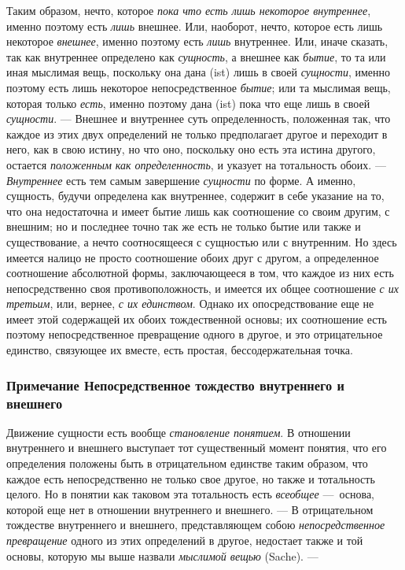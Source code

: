 Таким образом, нечто, которое {\em пока что есть лишь
некоторое внутреннее}, именно поэтому есть {\em лишь}
внешнее. Или, наоборот, нечто, которое есть лишь некоторое
{\em внешнее}, именно поэтому есть
{\em лишь} внутреннее. Или, иначе сказать, так как
внутреннее определено как {\em сущность}, а внешнее как
{\em бытие}, то та или иная мыслимая вещь, поскольку
она дана (ist) лишь в своей {\em сущности}, именно
поэтому есть лишь некоторое непосредственное
{\em бытие}; или та мыслимая вещь, которая только
{\em есть}, именно поэтому дана (ist) пока что еще лишь
в своей {\em сущности}. — Внешнее и внутреннее суть
определенность, положенная так, что каждое из этих двух определений не
только предполагает другое и переходит в него, как в свою истину, но что
оно, поскольку оно есть эта истина другого, остается
{\em положенным как определенность}, и указует на
тотальность обоих. — {\em Внутреннее} есть тем самым
завершение {\em сущности} по форме. А именно, сущность,
будучи определена как внутреннее, содержит в себе указание на то, что она
недостаточна и имеет бытие лишь как соотношение со своим другим, с внешним;
но и последнее точно так же есть не только бытие или также и существование,
а нечто соотносящееся с сущностью или с внутренним. Но здесь имеется налицо
не просто соотношение обоих друг с другом, а определенное соотношение
абсолютной формы, заключающееся в том, что каждое из них есть
непосредственно своя противоположность, и имеется их общее соотношение
{\em с их третьим}, или, вернее,
{\em с их единством}. Однако их опосредствование еще не
имеет этой содержащей их обоих тождественной основы; их соотношение есть
поэтому непосредственное превращение одного в другое, и это отрицательное
единство, связующее их вместе, есть простая, бессодержательная точка.


\subsubsection[Примечание Непосредственное тождество внутреннего и внешнего]
{Примечание Непосредственное тождество внутреннего и внешнего}

Движение сущности есть вообще {\em становление
понятием}. В отношении внутреннего и внешнего выступает тот существенный
момент понятия, что его определения положены быть в отрицательном единстве
таким образом, что каждое есть непосредственно не только свое другое, но
также и тотальность целого. Но в понятии как таковом эта тотальность есть
{\em всеобщее} —~основа, которой еще нет в отношении
внутреннего и внешнего. — В отрицательном тождестве внутреннего и внешнего,
представляющем собою {\em непосредственное превращение}
одного из этих определений в другое, недостает также и той основы, которую
мы выше назвали {\em мыслимой вещью} (Sache). —

